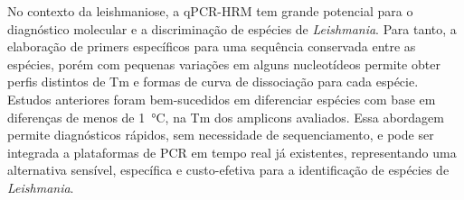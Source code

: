 No contexto da leishmaniose, a qPCR-HRM tem grande potencial
para o diagnóstico molecular e a discriminação de espécies de
\textit{Leishmania}. Para tanto, a elaboração de primers específicos para uma
sequência conservada entre as espécies, porém com pequenas variações em alguns
nucleotídeos permite obter perfis distintos de Tm e
formas de curva de dissociação para cada espécie.
Estudos anteriores foram bem-sucedidos em diferenciar espécies com base em
diferenças de menos de \qty{1}{\celsius}, na Tm dos amplicons
avaliados\cite{Azam2024,HRMzampi2016,SaadiBenAoun2024}.
Essa abordagem permite diagnósticos rápidos, sem necessidade de sequenciamento,
e pode ser integrada a plataformas de PCR em tempo real já existentes,
representando uma alternativa sensível, específica e custo-efetiva para a
identificação de espécies de \textit{Leishmania}.
 
